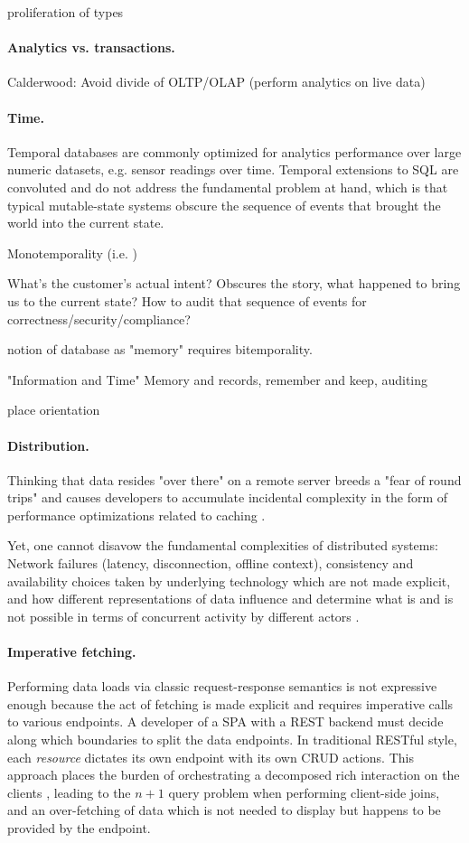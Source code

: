 proliferation of types


\paragraph{Analytics vs. transactions.}
Calderwood: Avoid divide of OLTP/OLAP (perform analytics on live data)

\paragraph{Time.}
Temporal databases are commonly optimized for analytics performance over large numeric datasets, e.g. sensor readings over time. Temporal extensions to SQL \cite{kulkarni2012temporal} are convoluted and do not address the fundamental problem at hand, which is that typical mutable-state systems obscure the sequence of events that brought the world into the current state.

Monotemporality (i.e. )


What's the customer's actual intent? Obscures the story, what happened to bring us to the current state? How to audit that sequence of events for correctness/security/compliance?


notion of database as "memory" requires bitemporality.


"Information and Time" Memory and records, remember and keep, auditing

place orientation


\paragraph{Distribution.}
Thinking that data resides "over there" on a remote server breeds a "fear of round trips" and causes developers to accumulate incidental complexity in the form of performance optimizations related to caching \cite{hickey2012dbvalue}.

Yet, one cannot disavow the fundamental complexities of distributed systems: Network failures (latency, disconnection, offline context), consistency and availability choices taken by underlying technology which are not made explicit, and how different representations of data influence and determine what is and is not possible in terms of concurrent activity by different actors \cite{emerick2014api}.

\paragraph{Imperative fetching.}
Performing data loads via classic request-response semantics is not expressive enough because the act of fetching is made explicit and requires imperative calls to various endpoints. A developer of a \gls{SPA} with a \gls{REST} backend must decide along which boundaries to split the data endpoints. In traditional RESTful style, each \emph{resource} dictates its own endpoint with its own \gls{CRUD} actions. This approach places the burden of orchestrating a decomposed rich interaction on the clients \cite{calderwood15cqrs}, leading to the $n+1$ query problem when performing client-side joins, and an over-fetching of data which is not needed to display but happens to be provided by the endpoint.


